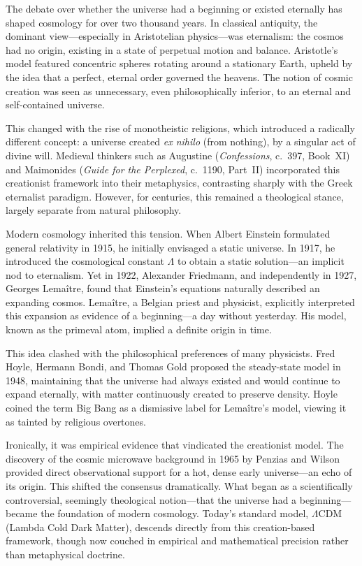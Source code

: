 \begin{historical}
The debate over whether the universe had a beginning or existed eternally has shaped cosmology for over two thousand years. In classical antiquity, the dominant view—especially in Aristotelian physics—was eternalism: the cosmos had no origin, existing in a state of perpetual motion and balance. Aristotle’s model featured concentric spheres rotating around a stationary Earth, upheld by the idea that a perfect, eternal order governed the heavens. The notion of cosmic creation was seen as unnecessary, even philosophically inferior, to an eternal and self-contained universe.

This changed with the rise of monotheistic religions, which introduced a radically different concept: a universe created \textit{ex nihilo} (from nothing), by a singular act of divine will. Medieval thinkers such as Augustine (\textit{Confessions}, c.~397, Book~XI) and Maimonides (\textit{Guide for the Perplexed}, c.~1190, Part~II) incorporated this creationist framework into their metaphysics, contrasting sharply with the Greek eternalist paradigm. However, for centuries, this remained a theological stance, largely separate from natural philosophy.

Modern cosmology inherited this tension. When Albert Einstein formulated general relativity in 1915, he initially envisaged a static universe. In 1917, he introduced the cosmological constant \(\Lambda\) to obtain a static solution—an implicit nod to eternalism. Yet in 1922, Alexander Friedmann, and independently in 1927, Georges Lemaître, found that Einstein’s equations naturally described an expanding cosmos. Lemaître, a Belgian priest and physicist, explicitly interpreted this expansion as evidence of a beginning—a \QSOpen{}day without yesterday.\QSClose{} His model, known as the \QSOpen{}primeval atom,\QSClose{} implied a definite origin in time.

This idea clashed with the philosophical preferences of many physicists. Fred Hoyle, Hermann Bondi, and Thomas Gold proposed the steady-state model in 1948, maintaining that the universe had always existed and would continue to expand eternally, with matter continuously created to preserve density. Hoyle coined the term \QSOpen{}Big Bang\QSClose{} as a dismissive label for Lemaître’s model, viewing it as tainted by religious overtones.

Ironically, it was empirical evidence that vindicated the \QSOpen{}creationist\QSClose{} model. The discovery of the cosmic microwave background in 1965 by Penzias and Wilson provided direct observational support for a hot, dense early universe—an echo of its origin. This shifted the consensus dramatically. What began as a scientifically controversial, seemingly theological notion—that the universe had a beginning—became the foundation of modern cosmology. Today’s standard model, $\Lambda$CDM (Lambda Cold Dark Matter), descends directly from this creation-based framework, though now couched in empirical and mathematical precision rather than metaphysical doctrine.
\end{historical}
